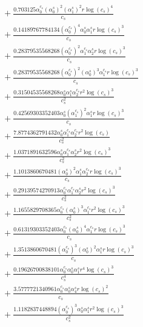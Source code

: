 \documentclass[10pt]{article}
\begin{document}
\begin{align*}
&{}  + \frac{0.703125 \alpha_{0}^{c_s} \left(\alpha_{0}^s\right)^{2} \left(\alpha_{1}^s\right)^{2} r \log{\left(c_{s} \right)}^{4}}{c_{s}} \\
&{}  + \frac{0.14189767784134 \left(\alpha_{0}^{c_s}\right)^{4} \alpha_{0}^s \alpha_{1}^s r \log{\left(c_{s} \right)}^{3}}{c_{s}} \\
&{}  + \frac{0.28379535568268 \left(\alpha_{0}^{c_s}\right)^{2} \alpha_{1}^{c_s} \alpha_{2}^s r \log{\left(c_{s} \right)}^{3}}{c_{s}} \\
&{}  + \frac{0.28379535568268 \left(\alpha_{0}^{c_s}\right)^{2} \left(\alpha_{0}^s\right)^{3} \alpha_{1}^{c_s} r \log{\left(c_{s} \right)}^{3}}{c_{s}} \\
&{}  + \frac{0.31504535568268 \alpha_{0}^s \alpha_{1}^s \alpha_{2}^{c_s} r^{2} \log{\left(c_{s} \right)}^{3}}{c_{s}^{2}} \\
&{}  + \frac{0.42569303352403 \alpha_{0}^s \left(\alpha_{1}^{c_s}\right)^{2} \alpha_{1}^s r \log{\left(c_{s} \right)}^{3}}{c_{s}} \\
&{}  + \frac{7.8774362791432 \alpha_{0}^s \alpha_{1}^{c_s} \alpha_{2}^{c_s} r^{2} \log{\left(c_{s} \right)}}{c_{s}^{2}} \\
&{}  + \frac{1.0371891632596 \alpha_{0}^s \alpha_{1}^{c_s} \alpha_{2}^s r^{2} \log{\left(c_{s} \right)}^{3}}{c_{s}^{2}} \\
&{}  + \frac{1.1013860670481 \left(\alpha_{0}^s\right)^{2} \alpha_{1}^s \alpha_{2}^{c_s} r \log{\left(c_{s} \right)}^{3}}{c_{s}} \\
&{}  + \frac{0.29139574270913 \alpha_{0}^{c_s} \alpha_{1}^{c_s} \alpha_{2}^s r^{2} \log{\left(c_{s} \right)}^{3}}{c_{s}^{2}} \\
&{}  + \frac{1.1655829708365 \alpha_{0}^{c_s} \left(\alpha_{0}^s\right)^{3} \alpha_{1}^{c_s} r^{2} \log{\left(c_{s} \right)}^{3}}{c_{s}^{2}} \\
&{}  + \frac{0.61319303352403 \alpha_{0}^{c_s} \left(\alpha_{0}^s\right)^{4} \alpha_{1}^{c_s} r \log{\left(c_{s} \right)}^{3}}{c_{s}} \\
&{}  + \frac{1.3513860670481 \left(\alpha_{0}^{c_s}\right)^{3} \left(\alpha_{0}^s\right)^{2} \alpha_{1}^s r \log{\left(c_{s} \right)}^{3}}{c_{s}} \\
&{}  + \frac{0.19626700838101 \alpha_{0}^{c_s} \alpha_{0}^s \alpha_{1}^s r^{4} \log{\left(c_{s} \right)}^{3}}{c_{s}^{4}} \\
&{}  + \frac{3.5777721340961 \alpha_{0}^{c_s} \alpha_{0}^s \alpha_{4}^s r \log{\left(c_{s} \right)}^{2}}{c_{s}} \\
&{}  + \frac{1.1182837448894 \left(\alpha_{0}^{c_s}\right)^{3} \alpha_{0}^s \alpha_{1}^s r^{2} \log{\left(c_{s} \right)}^{3}}{c_{s}^{2}} \\

\end{align*}
\end{document}
